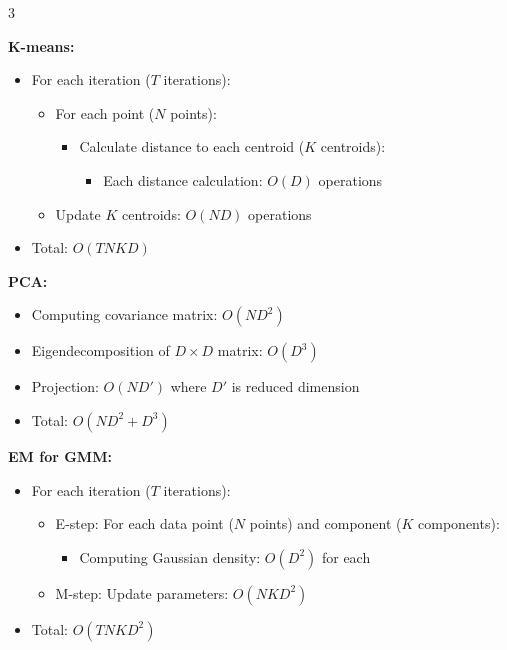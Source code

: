 \documentclass[10pt,landscape]{article}
\begin{document}
\begin{multicols}{3}
\begin{tcolorbox}[breakable, title=Time Complexity Analysis, colback=white, boxsep=1pt, left=1pt, right=1pt, top=1pt, bottom=1pt]
\textbf{K-means:}
\begin{itemize}[leftmargin=*,noitemsep,topsep=0pt]
    \item For each iteration ($T$ iterations):
        \begin{itemize}[noitemsep]
            \item For each point ($N$ points):
                \begin{itemize}[noitemsep]
                    \item Calculate distance to each centroid ($K$ centroids):
                        \begin{itemize}[noitemsep]
                            \item Each distance calculation: $O(D)$ operations
                        \end{itemize}
                \end{itemize}
            \item Update $K$ centroids: $O(ND)$ operations
        \end{itemize}
    \item Total: $O(TNKD)$
\end{itemize}

\textbf{PCA:}
\begin{itemize}[leftmargin=*,noitemsep,topsep=0pt]
    \item Computing covariance matrix: $O(ND^2)$
    \item Eigendecomposition of $D \times D$ matrix: $O(D^3)$
    \item Projection: $O(ND')$ where $D'$ is reduced dimension
    \item Total: $O(ND^2 + D^3)$
\end{itemize}

\textbf{EM for GMM:}
\begin{itemize}[leftmargin=*,noitemsep,topsep=0pt]
    \item For each iteration ($T$ iterations):
        \begin{itemize}[noitemsep]
            \item E-step: For each data point ($N$ points) and component ($K$ components):
                \begin{itemize}[noitemsep]
                    \item Computing Gaussian density: $O(D^2)$ for each
                \end{itemize}
            \item M-step: Update parameters: $O(NKD^2)$
        \end{itemize}
    \item Total: $O(TNKD^2)$
\end{itemize}
\end{tcolorbox}

\end{multicols}
\end{document}
